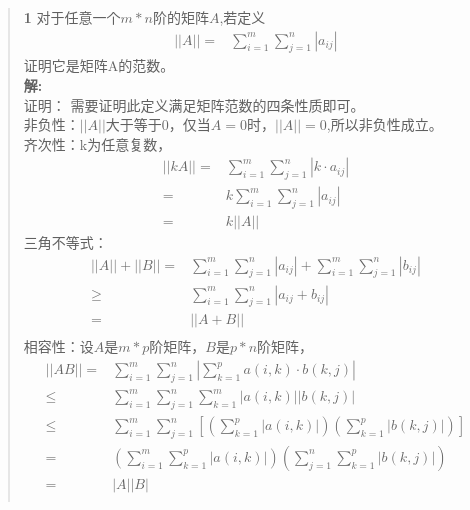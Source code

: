\documentclass[UTF8]{ctexart}
\begin{document}
\begin{quote}
\textbf{1 }对于任意一个$m*n$阶的矩阵$A$,若定义
\begin{equation}
	\begin{aligned}
		||A||=&\sum_{i=1}^{m}\sum_{j=1}^{n}|a_{ij}|
	\end{aligned}
\end{equation} 
证明它是矩阵A的范数。
\\
\textbf{解:}\\
证明：
	需要证明此定义满足矩阵范数的四条性质即可。\\
	非负性：$||A||$大于等于0，仅当$A=0$时，$||A||=0$,所以非负性成立。\\
	齐次性：k为任意复数，
\begin{equation}
	\begin{aligned}
		||kA||=&\sum_{i=1}^{m}\sum_{j=1}^{n}|k\cdot a_{ij}|\\
			  =&k\sum_{i=1}^{m}\sum_{j=1}^{n}|a_{ij}|\\
			  =&k||A||
	\end{aligned}
\end{equation} 
三角不等式：\\
\begin{equation}
	\begin{aligned}
		||A||+||B||=&\sum_{i=1}^{m}\sum_{j=1}^{n}|a_{ij}|+\sum_{i=1}^{m}\sum_{j=1}^{n}|b_{ij}|\\
			 \geq &\sum_{i=1}^{m}\sum_{j=1}^{n}|a_{ij}+b_{ij}|\\
			 =& ||A+B||\\
			\end{aligned}
		\end{equation}
相容性：设$A$是$m*p$阶矩阵，$B$是$p*n$阶矩阵，\\
\begin{equation}
	\begin{aligned}
			 ||AB||=&\sum_{i=1}^{m}\sum_{j=1}^{n}\left|\sum_{k=1}^{p}a(i,k)
		\cdot b(k,j)\right|\\
		\leq &\sum_{i=1}^{m}\sum_{j=1}^{n}\sum_{k=1}^{m}|a(i,k)||b(k,j)|\\
		\leq & \sum_{i=1}^{m}\sum_{j=1}^{n}
		\left[\left(\sum_{k=1}^{p}|a(i,k)|\right)
		\left(\sum_{k=1}^{p}|b(k,j)|\right)\right]\\
		=&\left(\sum_{i=1}^{m}\sum_{k=1}^{p}|a(i,k)|\right)
		  \left(\sum_{j=1}^{n}\sum_{k=1}^{p}|b(k,j)|\right)\\
		=&|A||B| \\
	\end{aligned}
\end{equation}

\end{quote}
\end{document}
